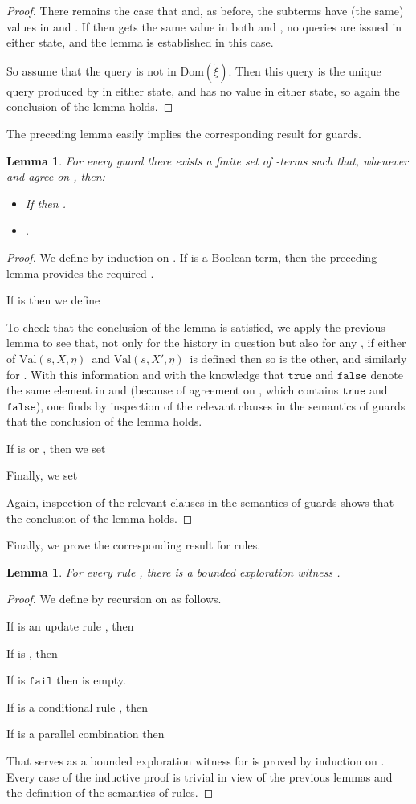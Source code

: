 \documentclass{LMCS}
\newtheorem{la}[thm]{Lemma}
\theoremstyle{definition}
\newenvironment{ls}{\begin{itemize}}{\end{itemize}}
\newcommand{\ans}{\dot}
\newcommand{\dom}[1]{\ensuremath{{\text{Dom}}(#1)}}
\newcommand{\ttt}[1]{\ensuremath{\mathtt {#1}}}
\newcommand{\val}[3]{\ensuremath{\text{Val}(#1,#2,#3)}}
\begin{document}
\begin{proof}
There remains the case that  and, as before, the subterms
 have (the same) values  in  and .  If  then  gets the same value
 in both  and , no queries are
issued in either state, and the lemma is established in this case.

So assume that the query  is not in \dom{\ans\xi}.
Then this query is the unique query produced by  in either state,
and  has no value in either state, so again the conclusion of the
lemma holds.
\end{proof}

The preceding lemma easily implies the corresponding result for
guards.

\begin{la}
For every guard  there exists a finite set  of
-terms such that, whenever  and  agree on
, then:
\begin{ls}
  \item If  then .
  \item .
\end{ls}
\end{la}

\begin{proof}
We define  by induction on .  If  is a Boolean
term, then the preceding lemma provides the required .

If  is  then we define

To check that the conclusion of the lemma is satisfied, we apply the
previous lemma to see that, not only for the history  in question
but also for any , if either of \val sX\eta\ and \val
s{X'}\eta\ is defined then so is the other, and similarly for .
With this information and
with the knowledge that \ttt{true} and \ttt{false} denote the same
element in  and  (because of agreement on , which
contains \ttt{true} and \ttt{false}), one finds by inspection of the
relevant clauses in the semantics of guards that the conclusion of the
lemma holds.

If  is  or , then we set

Finally, we set

Again, inspection of the relevant clauses in the semantics of guards
shows that the conclusion of the lemma holds.
\end{proof}

Finally, we prove the corresponding result for rules.

\begin{la}
For every rule , there is a bounded exploration witness .
\end{la}

\begin{proof}
We define  by recursion on  as follows.

If  is an update rule , then


If  is , then


If  is \ttt{fail} then  is empty.

If  is a conditional rule , then


If  is a parallel combination  then


That  serves as a bounded exploration witness for  is proved
by induction on .  Every case of the inductive proof is trivial in
view of the previous lemmas and the definition of the semantics of
rules.
\end{proof}
\end{document}
